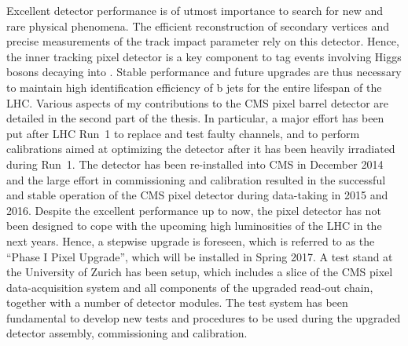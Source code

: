\noindent Excellent detector performance is of utmost importance to search for new and rare physical phenomena.
The efficient reconstruction of secondary vertices and precise measurements of the track impact parameter rely on this detector.
Hence, the inner tracking pixel detector is a key component to tag events involving Higgs bosons decaying into \bbbar.
Stable performance and future upgrades are thus necessary to maintain high identification efficiency of b jets for the entire lifespan of the LHC.
Various aspects of my contributions to the CMS pixel barrel detector are detailed in the second part of the thesis.
In particular, a major effort has been put after LHC Run~1 to replace and test faulty channels,
and to perform calibrations aimed at optimizing the detector after it has been heavily irradiated during Run~1.
The detector has been re-installed into CMS in December 2014 and the large effort in commissioning and calibration 
resulted in the successful and stable operation of the CMS pixel detector during data-taking in 2015 and 2016.
Despite the excellent performance up to now, the pixel detector has not been designed to cope with the upcoming high luminosities of the LHC in the next years.
Hence, a stepwise upgrade is foreseen, which is referred to as the ``Phase I Pixel Upgrade'', which will be installed in Spring 2017.
A test stand at the University of Zurich has been setup, which includes a slice of the CMS pixel data-acquisition system and all components of the upgraded read-out chain, together with a number of detector modules.
The test system has been fundamental to develop new tests and procedures to be used during the upgraded detector assembly, commissioning and calibration.

\vspace*{\fill}
